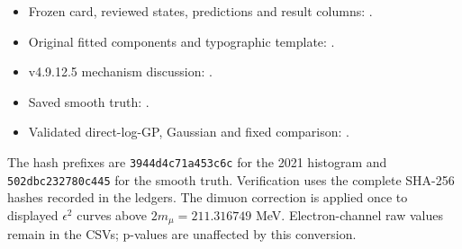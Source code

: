 \documentclass[11pt]{article}
\newcommand{\eps}{\ensuremath{\epsilon}}
\begin{document}
\begin{itemize}
\item Frozen card, reviewed states, predictions and result columns:
.
\item Original fitted components and typographic template:
.
\item v4.9.12.5 mechanism discussion:
.
\item Saved smooth truth:
.
\item Validated direct-log-GP, Gaussian and fixed comparison:
.
\end{itemize}

The hash prefixes are \texttt{3944d4c71a453c6c} for the 2021 histogram and
\texttt{502dbc232780c445} for the smooth truth. Verification uses the complete
SHA-256 hashes recorded in the ledgers.
The dimuon correction is applied once to displayed $\eps^2$ curves above
$2m_\mu=211.316749$ MeV. Electron-channel raw values remain in the CSVs;
p-values are unaffected by this conversion.
\end{document}
